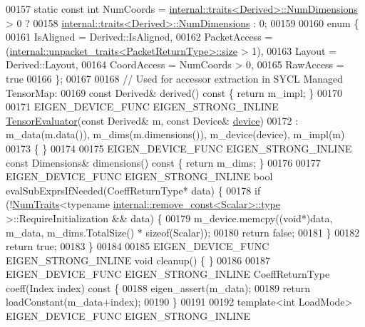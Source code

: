 \begin{DoxyCode}
00157   \textcolor{keyword}{static} \textcolor{keyword}{const} \textcolor{keywordtype}{int} NumCoords = \hyperlink{struct_eigen_1_1internal_1_1traits}{internal::traits<Derived>::NumDimensions}
       > 0 ?
00158                                \hyperlink{struct_eigen_1_1internal_1_1traits}{internal::traits<Derived>::NumDimensions}
       : 0;
00159 
00160   \textcolor{keyword}{enum} \{
00161     IsAligned = Derived::IsAligned,
00162     PacketAccess = (\hyperlink{struct_eigen_1_1internal_1_1unpacket__traits}{internal::unpacket\_traits<PacketReturnType>::size}
       > 1),
00163     Layout = Derived::Layout,
00164     CoordAccess = NumCoords > 0,
00165     RawAccess = \textcolor{keyword}{true}
00166   \};
00167 
00168   \textcolor{comment}{// Used for accessor extraction in SYCL Managed TensorMap:}
00169   \textcolor{keyword}{const} Derived& derived()\textcolor{keyword}{ const }\{ \textcolor{keywordflow}{return} m\_impl; \}
00170 
00171   EIGEN\_DEVICE\_FUNC EIGEN\_STRONG\_INLINE \hyperlink{struct_eigen_1_1_tensor_evaluator}{TensorEvaluator}(\textcolor{keyword}{const} Derived& m, \textcolor{keyword}{const} Device& 
      \hyperlink{struct_eigen_1_1_tensor_evaluator_a98b51809ed8f7a1f736eb7b952b9636e}{device})
00172       : m\_data(m.data()), m\_dims(m.dimensions()), m\_device(device), m\_impl(m)
00173   \{ \}
00174 
00175   EIGEN\_DEVICE\_FUNC EIGEN\_STRONG\_INLINE \textcolor{keyword}{const} Dimensions& dimensions()\textcolor{keyword}{ const }\{ \textcolor{keywordflow}{return} m\_dims; \}
00176 
00177   EIGEN\_DEVICE\_FUNC EIGEN\_STRONG\_INLINE \textcolor{keywordtype}{bool} evalSubExprsIfNeeded(CoeffReturnType* data) \{
00178     \textcolor{keywordflow}{if} (!\hyperlink{group___core___module_struct_eigen_1_1_num_traits}{NumTraits}<\textcolor{keyword}{typename} \hyperlink{group___sparse_core___module}{internal::remove\_const<Scalar>::type}
      >::RequireInitialization && data) \{
00179       m\_device.memcpy((\textcolor{keywordtype}{void}*)data, m\_data, m\_dims.TotalSize() * \textcolor{keyword}{sizeof}(Scalar));
00180       \textcolor{keywordflow}{return} \textcolor{keyword}{false};
00181     \}
00182     \textcolor{keywordflow}{return} \textcolor{keyword}{true};
00183   \}
00184 
00185   EIGEN\_DEVICE\_FUNC EIGEN\_STRONG\_INLINE \textcolor{keywordtype}{void} cleanup() \{ \}
00186 
00187   EIGEN\_DEVICE\_FUNC EIGEN\_STRONG\_INLINE CoeffReturnType coeff(Index index)\textcolor{keyword}{ const }\{
00188     eigen\_assert(m\_data);
00189     \textcolor{keywordflow}{return} loadConstant(m\_data+index);
00190   \}
00191 
00192   \textcolor{keyword}{template}<\textcolor{keywordtype}{int} LoadMode> EIGEN\_DEVICE\_FUNC EIGEN\_STRONG\_INLINE

\end{DoxyCode}
